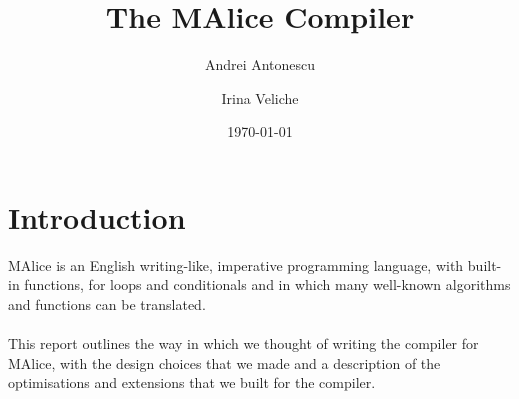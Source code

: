 \documentclass[a4wide, 11pt]{article}
\begin{document}
\title{The MAlice Compiler}

\author{Andrei Antonescu \and Irina Veliche}

\date{\today}         %

\maketitle            %

\pagebreak

\section{Introduction}
MAlice is an English writing-like, imperative programming language, with built-in functions, for loops and conditionals and in which many well-known algorithms and functions can be translated.
\\\\
This report outlines the way in which we thought of writing the compiler for MAlice, with the design choices that we made and a description of the optimisations and extensions that we built for the compiler.
\end{document}

